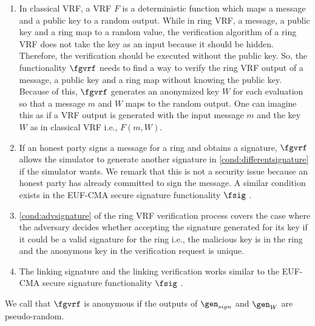 \begin{enumerate}[label={{R-} }{{\arabic*}}, start = 1]
	
	\item In classical VRF, a VRF $ F $ is a deterministic function which maps a message and a public key to a random output. While in ring VRF, a message, a public key and a ring map to a random value, the verification algorithm of a ring VRF does not take the key as an input because it should be hidden. Therefore, the verification should be executed without the public key.  So, the functionality $ \fgvrf $ needs to find a way to verify the ring VRF output of a message, a public key and a ring map without knowing the public key. Because of this, $ \fgvrf $ generates an anonymized key $ W $ for each evaluation so that a message $ m $  and $ W $ maps to the random output. One can imagine this  as if a VRF output is generated with the input message $ m $ and the key $ W $ as in classical VRF i.e.,  $ F(m, W) $. 
	
	\item  If an honest party signs a message for a ring and obtains a signature, $ \fgvrf $ allows the simulator to generate another signature in \ref{cond:differentsignature} if the simulator wants. We remark that this is not a security issue because an honest party has already committed to sign the message.  A similar condition  exists in the EUF-CMA secure signature functionality $ \fsig $ \cite{canettiFsig}.
	
	\item \ref{cond:advsignature} of the ring VRF verification process covers the case where the adversary decides whether accepting the signature generated for its key if  it could be a valid signature for the ring i.e., the malicious key is in the ring and the anonymous key in the verification request is unique.
	
	\item The linking signature and the linking verification works similar to the EUF-CMA secure signature functionality $ \fsig $ \cite{canettiFsig}.
	
	
\end{enumerate}


\begin{definition}\label{def:anonymity}
	We call that $ \fgvrf $ is anonymous if the outputs of $ \gen_{sign} $ and $ \gen_W $ are pseudo-random.
\end{definition}




	


